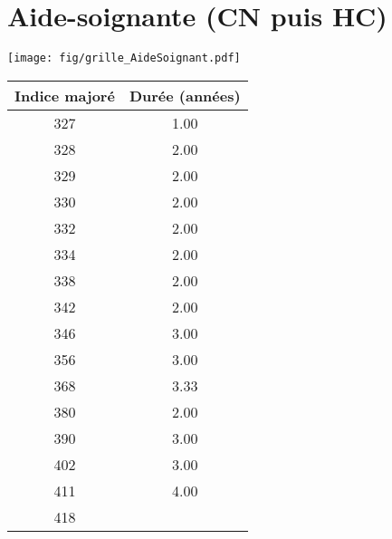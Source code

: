 \newpage 
 
\chapter{Aide-soignante (CN puis HC)} 

\begin{minipage}{0.55\linewidth}\texttt{[image: fig/grille\_AideSoignant.pdf]}\end{minipage} 
\begin{minipage}{0.3\linewidth} 
 \begin{center} 

\begin{tabular}[htb]{|c|c|} 
\hline 
 Indice majoré &  Durée (années) \\ 
\hline \hline 
 327 &  1.00 \\ 
\hline 
 328 &  2.00 \\ 
\hline 
 329 &  2.00 \\ 
\hline 
 330 &  2.00 \\ 
\hline 
 332 &  2.00 \\ 
\hline 
 334 &  2.00 \\ 
\hline 
 338 &  2.00 \\ 
\hline 
 342 &  2.00 \\ 
\hline 
 346 &  3.00 \\ 
\hline 
 356 &  3.00 \\ 
\hline 
 368 &  3.33 \\ 
\hline 
 380 &  2.00 \\ 
\hline 
 390 &  3.00 \\ 
\hline 
 402 &  3.00 \\ 
\hline 
 411 &  4.00 \\ 
\hline 
 418 &   \\ 
\hline 
\hline 
\end{tabular} 
\end{center} 
 \end{minipage} 

~\\ 
 


   
 \localtableofcontents 

